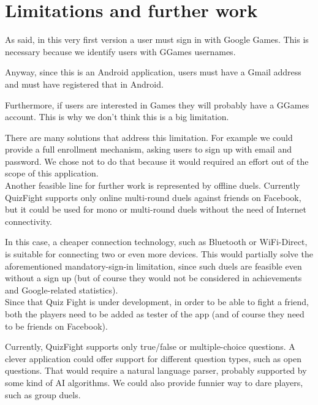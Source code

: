 \section{Limitations and further work}\label{sec:limitations}

As said, in this very first version a user must sign in with Google Games.
This is necessary because we identify users with GGames usernames.

Anyway, since this is an Android application, users must have a Gmail
address and must have registered that in Android.

Furthermore, if users are interested in Games they will probably have
a GGames account.
This is why we don't think this is a big limitation.

There are many solutions that address this limitation.
For example we could provide a full enrollment mechanism, asking users to sign
up with email and password. We chose not to do that because it would required
an effort out of the scope of this application.  \\

Another feasible line for further work is represented by offline duels.
Currently QuizFight supports only online multi-round duels against
friends on Facebook, but it could be used for mono or multi-round duels
without the need of Internet connectivity.

In this case, a cheaper connection technology, such as Bluetooth or
WiFi-Direct, is suitable for connecting two or even more devices.
This would partially solve the aforementioned mandatory-sign-in limitation,
since such duels are feasible even without a sign up (but of course they would
not be considered in achievements and Google-related statistics). \\

Since that Quiz Fight is under development, in order to be able to fight
a friend, both the players need to be added as tester of the app
(and of course they need to be friends on Facebook).

Currently, QuizFight supports only true/false or multiple-choice questions.
A clever application could offer support for different question types, such as
open questions.
That would require a natural language parser, probably supported by some kind of AI
algorithms.
We could also provide funnier way to dare players, such as group duels.
